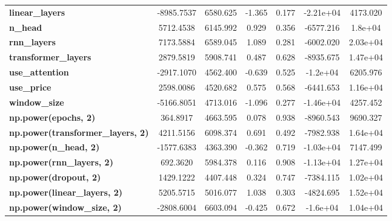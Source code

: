 \begin{center}
\begin{tabular}{lcccccc}
\textbf{linear\_layers}                   &   -8985.7537  &     6580.625     &    -1.365  &         0.177        &    -2.21e+04    &     4173.020     \\
\textbf{n\_head}                          &    5712.4538  &     6145.992     &     0.929  &         0.356        &    -6577.216    &      1.8e+04     \\
\textbf{rnn\_layers}                      &    7173.5884  &     6589.045     &     1.089  &         0.281        &    -6002.020    &     2.03e+04     \\
\textbf{transformer\_layers}              &    2879.5819  &     5908.741     &     0.487  &         0.628        &    -8935.675    &     1.47e+04     \\
\textbf{use\_attention}                   &   -2917.1070  &     4562.400     &    -0.639  &         0.525        &     -1.2e+04    &     6205.976     \\
\textbf{use\_price}                       &    2598.0086  &     4520.682     &     0.575  &         0.568        &    -6441.653    &     1.16e+04     \\
\textbf{window\_size}                     &   -5166.8051  &     4713.016     &    -1.096  &         0.277        &    -1.46e+04    &     4257.452     \\
\textbf{np.power(epochs, 2)}              &     364.8917  &     4663.595     &     0.078  &         0.938        &    -8960.543    &     9690.327     \\
\textbf{np.power(transformer\_layers, 2)} &    4211.5156  &     6098.374     &     0.691  &         0.492        &    -7982.938    &     1.64e+04     \\
\textbf{np.power(n\_head, 2)}             &   -1577.6383  &     4363.390     &    -0.362  &         0.719        &    -1.03e+04    &     7147.499     \\
\textbf{np.power(rnn\_layers, 2)}         &     692.3620  &     5984.378     &     0.116  &         0.908        &    -1.13e+04    &     1.27e+04     \\
\textbf{np.power(dropout, 2)}             &    1429.1222  &     4407.448     &     0.324  &         0.747        &    -7384.115    &     1.02e+04     \\
\textbf{np.power(linear\_layers, 2)}      &    5205.5715  &     5016.077     &     1.038  &         0.303        &    -4824.695    &     1.52e+04     \\
\textbf{np.power(window\_size, 2)}        &   -2808.6004  &     6603.094     &    -0.425  &         0.672        &     -1.6e+04    &     1.04e+04     \\

\end{tabular}
\end{center}
